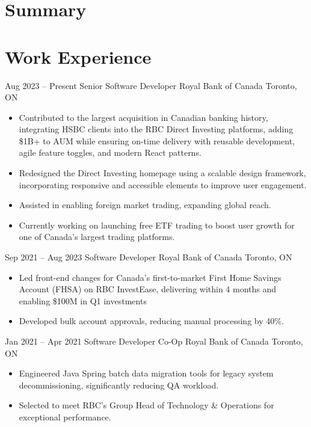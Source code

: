 \documentclass[letterpaper]{moderncv}
\begin{document}
\makecvtitle

\section{Summary}

\section{Work Experience}
\cventry
{Aug 2023 -- Present}
{Senior Software Developer}
{Royal Bank of Canada}
{Toronto, ON}
{}
{\begin{itemize}%
	\item Contributed to the largest acquisition in Canadian banking history, integrating HSBC clients into the RBC Direct Investing platforms, adding \$1B+ to AUM while ensuring on-time delivery with reusable development, agile feature toggles, and modern React patterns.
	\item Redesigned the Direct Investing homepage using a scalable design framework, incorporating responsive and accessible elements to improve user engagement.
	\item Assisted in enabling foreign market trading, expanding global reach.
	\item Currently working on launching free ETF trading to boost user growth for one of Canada's largest trading platforms.
	\end{itemize}}
\cventry
{Sep 2021 -- Aug 2023}
{Software Developer}
{Royal Bank of Canada}
{Toronto, ON}
{}
{\begin{itemize}%
	\item Led front-end changes for Canada's first-to-market First Home Savings Account (FHSA) on RBC InvestEase, delivering within 4 months and enabling \$100M in Q1 investments
	\item Developed bulk account approvals, reducing manual processing by 40\%.
	\end{itemize}}
\cventry
{Jan 2021 -- Apr 2021}
{Software Developer Co-Op}
{Royal Bank of Canada}
{Toronto, ON}
{}
{\begin{itemize}%
	\item Engineered Java Spring batch data migration tools for legacy system decommissioning, significantly reducing QA workload.
	\item Selected to meet RBC's Group Head of Technology \& Operations for exceptional performance.
	\end{itemize}}
\end{document}
